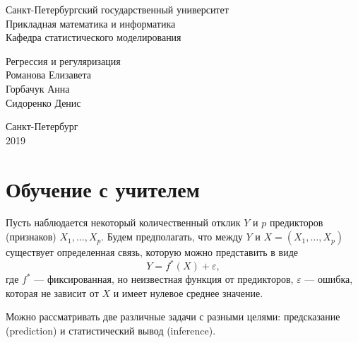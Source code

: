\documentclass[11pt,colorlinks=true]{article}
\begin{document}
	\thispagestyle{empty}
%
	\begin{center}
		Санкт-Петербургский государственный университет \\
		\vspace{0.3cm}	
		Прикладная математика и информатика \\
		\vspace{0.3cm}
		Кафедра статистического моделирования \\
		
		\vspace{6cm}			   	
			
			\vspace{0.3cm}	
			 {\huge Регрессия и регуляризация} \\
			 \vspace{0.5cm}
									Романова Елизавета \\
			Горбачук Анна \\
			Сидоренко Денис \\

			\vspace{10cm}	

		Санкт-Петербург \\
				2019
	\end{center}
	
\newpage


\tableofcontents

\newpage

\section{Обучение с учителем}

Пусть наблюдается некоторый количественный отклик $Y$ и $p$ предикторов (признаков) $X_{1},\ldots,X_{p}$. 
Будем предполагать, что между $Y$ и $X=(X_{1},\ldots,X_{p})$ существует определенная связь, которую можно представить в виде
\begin{equation*}
Y
=
f^{\ast}(X)+\varepsilon,
\end{equation*}
где $f^{\ast}$ --- фиксированная, но неизвестная функция от предикторов, $\varepsilon$ --- ошибка, которая не зависит от $X$ и имеет нулевое среднее значение.

Можно рассматривать две различные задачи с разными целями: предсказание (prediction) и статистический вывод (inference).
\end{document}
